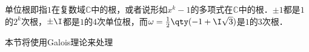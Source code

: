 


单位根即指$1$在复数域$\mathbb{C}$中的根，或者说形如$x^k-1$的多项式在$\mathbb{C}$中的根．$\pm 1$都是$1$的$2^k$次根，$\pm \I$都是$1$的$4$次单位根，而$\omega=\frac{1}{2}\qty(-1+\I\sqrt{3})$是$1$的$3$次根．

本节将使用Galois理论来处理




















